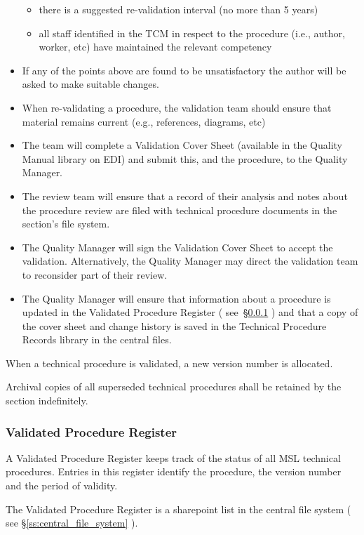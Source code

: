 \begin{itemize}
\begin{itemize}
\item there is a suggested re-validation interval (no more than 5 years)
\item all staff identified in the TCM in respect to the procedure (i.e., author, worker, etc) have maintained the relevant competency
\end{itemize}
\item If any of the points above are found to be unsatisfactory the author will be asked to make suitable changes.
\item When re-validating a procedure, the validation team should ensure that material remains current (e.g., references, diagrams, etc)
\item The team will complete a Validation Cover Sheet (available in the Quality Manual library on EDI) and submit this, and the procedure, to the Quality Manager. 
\item The review team will ensure that a record of their analysis and notes about the procedure review are filed with technical procedure documents in the section’s file system. 
\item The Quality Manager will sign the Validation Cover Sheet to accept the validation. Alternatively, the Quality Manager may direct the validation team to reconsider part of their review.
\item The Quality Manager will ensure that information about a procedure is updated in the Validated Procedure Register ( see~\S\ref{sss:validated_procedure_register} ) and that a copy of the cover sheet and change history is saved in the Technical Procedure Records library in the central files.
\end{itemize}

When a technical procedure is validated, a new version number is allocated. 

Archival copies of all superseded technical procedures shall be retained by the section indefinitely.

\subsubsection{Validated Procedure Register}
\label{sss:validated_procedure_register}
A Validated Procedure Register keeps track of the status of all MSL technical procedures. Entries in this register identify the procedure, the version number and the period of validity.

The Validated Procedure Register is a sharepoint list in the central file system ( see \S\ref{ss:central_file_system} ). 

